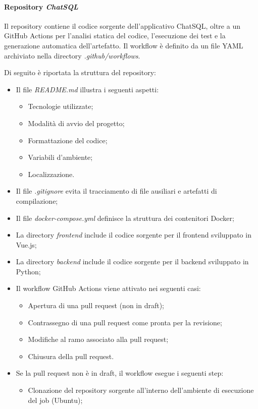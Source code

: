 \paragraph{Repository \emph{ChatSQL}}
Il repository contiene il codice sorgente dell'applicativo ChatSQL, oltre a un  GitHub Actions per l'analisi statica del codice, l'esecuzione dei test e la generazione automatica dell'artefatto. Il workflow è definito da un file YAML archiviato nella directory \emph{.github/workflows}.
\par Di seguito è riportata la struttura del repository:
\begin{itemize}
  \item Il file \emph{README.md} illustra i seguenti aspetti:
  \begin{itemize}
    \item Tecnologie utilizzate;
    \item Modalità di avvio del progetto;
    \item Formattazione del codice;
    \item Variabili d'ambiente;
    \item Localizzazione.
  \end{itemize}
  \item Il file \emph{.gitignore} evita il tracciamento di file ausiliari e artefatti di compilazione;
  \item Il file \emph{docker-compose.yml} definisce la struttura dei contenitori Docker;
  \item La directory \emph{frontend} include il codice sorgente per il frontend sviluppato in Vue.js;
  \item La directory \emph{backend} include il codice sorgente per il backend sviluppato in Python;
  \item Il workflow GitHub Actions viene attivato nei seguenti casi:
  \begin{itemize}
    \item Apertura di una pull request (non in draft);
    \item Contrassegno di una pull request come pronta per la revisione;
    \item Modifiche al ramo associato alla pull request;
    \item Chiusura della pull request.
  \end{itemize}
  \item Se la pull request non è in draft, il workflow esegue i seguenti step:
  \begin{itemize}
    \item Clonazione del repository sorgente all'interno dell'ambiente di esecuzione del job (Ubuntu);

\end{itemize}
\end{itemize}
